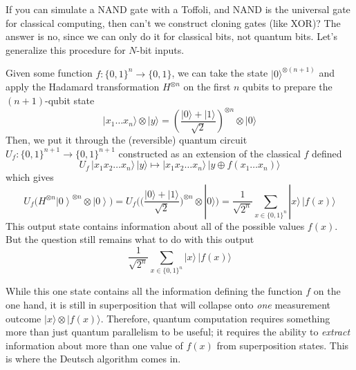 \documentclass{article}
\newcommand{\ket}[1]{\ensuremath{\left|#1\right\rangle}}
\begin{document}
    If you can simulate a NAND gate with a Toffoli, and NAND is the universal gate for classical computing, then can't we construct cloning gates (like XOR)? The answer is no, since we can only do it for classical bits, not quantum bits. Let's generalize this procedure for $N$-bit inputs. 

    \begin{theorem}
      Given some function $f: \{0, 1\}^n \longrightarrow \{0, 1\}$, we can take the state $|0\rangle^{\otimes (n+1)}$ and apply the Hadamard transformation $H^{\otimes n}$ on the first $n$ qubits to prepare the $(n+1)$-qubit state 
      \begin{equation} 
        |x_1 \ldots x_n \rangle \otimes |y\rangle = \left( \frac{|0\rangle + |1\rangle}{\sqrt{2}}\right)^{\otimes n} \otimes |0\rangle
      \end{equation}
      Then, we put it through the (reversible) quantum circuit $U_f: \{0, 1\}^{n+1} \longrightarrow \{0, 1\}^{n+1}$ constructed as an extension of the classical $f$ defined 
      \begin{equation} 
        U_f \, |x_1 x_2 \ldots x_n \rangle \, |y\rangle \mapsto |x_1 x_2 \ldots x_n \rangle \, |y \oplus f(x_1 \ldots x_n)\rangle
      \end{equation}
      which gives 
      \begin{equation} 
        U_f \big( H^{\otimes n} \ket{0}^{\otimes n} \otimes \ket{0} \big) = U_f \Bigg( \bigg( \frac{|0\rangle + |1\rangle}{\sqrt{2}} \bigg)^{\otimes n} \otimes |0\rangle \Bigg) = \frac{1}{\sqrt{2^n}} \sum_{x \in \{0, 1\}^n} |x\rangle \, |f(x)\rangle
      \end{equation}
      This output state contains information about all of the possible values $f(x)$. But the question still remains what to do with this output 
      \begin{equation} 
        \frac{1}{\sqrt{2^n}} \sum_{x \in \{0, 1\}^n} |x\rangle \, |f(x)\rangle
      \end{equation}
    \end{theorem}

    While this one state contains all the information defining the function $f$ on the one hand, it is still in superposition that will collapse onto \textit{one} measurement outcome $|x \rangle \otimes |f(x) \rangle$. Therefore, quantum computation requires something more than just quantum parallelism to be useful; it requires the ability to \textit{extract} information about more than one value of $f(x)$ from superposition states. This is where the Deutsch algorithm comes in. 
\end{document}
